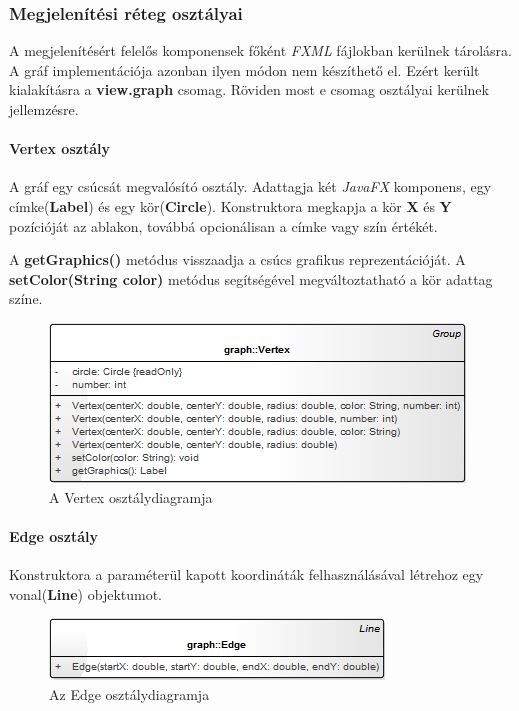 \documentclass{elteikthesis}
\begin{document}
\subsubsection{Megjelenítési réteg osztályai}
A megjelenítésért felelős komponensek főként \emph{FXML} fájlokban kerülnek tárolásra. A gráf implementációja azonban ilyen módon nem készíthető el. Ezért került kialakításra a \textbf{view.graph} csomag. Röviden most e csomag osztályai kerülnek jellemzésre.
\paragraph{Vertex osztály}
A gráf egy csúcsát megvalósító osztály. Adattagja két \emph{JavaFX} komponens, egy címke(\textbf{Label}) és egy kör(\textbf{Circle}). Konstruktora megkapja a kör \textbf{X} és \textbf{Y} pozícióját az ablakon, továbbá opcionálisan a címke vagy szín értékét.\par
A \textbf{getGraphics()} metódus visszaadja a csúcs grafikus reprezentációját. A \textbf{setColor(String color)} metódus segítségével megváltoztatható a kör adattag színe.
\begin{figure}[H]
	\centering
	\includegraphics{pics/class/Vertex.png}
	\caption{A Vertex osztálydiagramja}
\end{figure}
\paragraph{Edge osztály}
Konstruktora a paraméterül kapott koordináták felhasználásával létrehoz egy vonal(\textbf{Line}) objektumot.
\begin{figure}[H]
	\centering
	\includegraphics{pics/class/Edge.png}
	\caption{Az Edge osztálydiagramja}
\end{figure}
\end{document}
